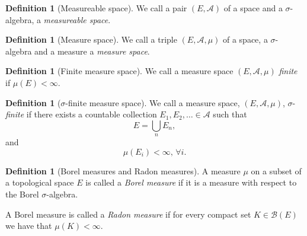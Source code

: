 \documentclass[11pt]{article}
\theoremstyle{definition}
\newtheorem{dfn}[thm]{Definition}
\theoremstyle{remark}
\begin{document}
\begin{dfn}[Measureable space]
We call a pair $(E, \mathcal{A})$ of a space and a $\sigma$-algebra, a \emph{measureable space}.
\end{dfn}

\begin{dfn}[Measure space]
We call a triple $(E, \mathcal{A}, \mu)$ of a space, a $\sigma$-algebra and a measure a \emph{measure space}.
\end{dfn}

\begin{dfn}[Finite measure space]
We call a measure space $(E, \mathcal{A}, \mu)$ \emph{finite} if $\mu(E) < \infty$.
\end{dfn}

\begin{dfn}[$\sigma$-finite measure space]
We call a measure space, $(E, \mathcal{A}, \mu)$, $\sigma$-\emph{finite} if there exists a countable collection $E_1, E_2, \dots \in \mathcal{A}$ such that
\[ E = \bigcup_n E_n, \] and
\[ \mu(E_i) < \infty, \, \forall i. \]
\end{dfn}

\begin{dfn}[Borel measures and Radon measures]
A measure $\mu$ on a subset of a topological space $E$ is called a \emph{Borel measure} if it is a measure with respect to the Borel $\sigma$-algebra.

A Borel measure is called a \emph{Radon measure} if for every compact set $K \in \mathcal{B}(E)$ we have that $\mu(K) < \infty$.
\end{dfn}
\end{document}
